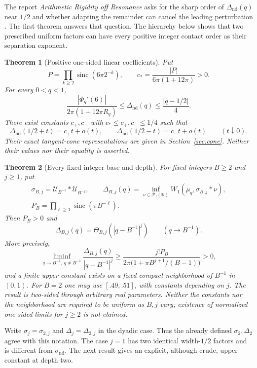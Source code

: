 \documentclass[11pt,letterpaper]{article}
\newtheorem{theorem}{Theorem}[section]
\theoremstyle{remark}\newtheorem{remark}[theorem]{Remark}
\newcommand{\R}{\mathbb R}\newcommand{\E}{\mathbb E}
\newcommand{\Un}{\mathcal U}\newcommand{\Law}{\mathcal L}
\newcommand{\Pone}{\mathcal P_1(\R)}
\newcommand{\sinc}{\operatorname{sinc}}
\begin{document}
The report \emph{Arithmetic Rigidity off Resonance} asks for the sharp order of $\Delta_{\mathrm{nd}}(q)$ near $1/2$ and whether adapting the remainder can cancel the leading perturbation \cite[question headed \emph{Sharp distance to a resonance}]{ProveIt}. The first theorem answers that question. The hierarchy below shows that two prescribed uniform factors can have every positive integer contact order as their separation exponent.

\begin{theorem}[Positive one-sided linear coefficients]\label{thm:linear}
Put
\[
P=\prod_{k\ge2}\sinc(6\pi2^{-k}),\qquad
c_* =\frac{|P|}{6\pi(1+12\pi)}>0.
\]
For every $0<q<1$,
\begin{equation}\label{eq:linear-bounds}
\frac{|\Phi_q'(6)|}{2\pi(1+12\pi R_q)}
\le\Delta_{\mathrm{nd}}(q)\le\frac{|q-1/2|}{4}.
\end{equation}
There exist constants $c_+,c_-$ with $c_*\le c_+,c_-\le1/4$ such that
\[
\Delta_{\mathrm{nd}}(1/2+t)=c_+t+o(t),\qquad
\Delta_{\mathrm{nd}}(1/2-t)=c_-t+o(t)\qquad(t\downarrow0).
\]
Their exact tangent-cone representations are given in Section~\ref{sec:cone}. Neither their values nor their equality is asserted.
\end{theorem}

\begin{theorem}[Every fixed integer base and depth]\label{thm:hierarchy}
For fixed integers $B\ge2$ and $j\ge1$, put
\begin{gather*}
\sigma_{B,j}=\Un_{B^{-1}}*\Un_{B^{-j}},\qquad
\Delta_{B,j}(q)=\inf_{\nu\in\Pone}W_1(\mu_q,\sigma_{B,j}*\nu),\\
P_B=\prod_{\ell\ge1}\sinc(\pi B^{-\ell}).
\end{gather*}
Then $P_B>0$ and
\[
\Delta_{B,j}(q)=\Theta_{B,j}(|q-B^{-1}|^j)\qquad(q\to B^{-1}).
\]
More precisely,
\[
\liminf_{q\to B^{-1},\ q\ne B^{-1}}
\frac{\Delta_{B,j}(q)}{|q-B^{-1}|^j}
\ge\frac{j!P_B}{2\pi\bigl(1+\pi B^{j+1}/(B-1)\bigr)}>0,
\]
and a finite upper constant exists on a fixed compact neighborhood of $B^{-1}$ in $(0,1)$. For $B=2$ one may use $[.49,.51]$, with constants depending on $j$. The result is two-sided through arbitrary real parameters. Neither the constants nor the neighborhood are required to be uniform as $B,j$ vary; existence of normalized one-sided limits for $j\ge2$ is not claimed.
\end{theorem}

Write $\sigma_j=\sigma_{2,j}$ and $\Delta_j=\Delta_{2,j}$ in the dyadic case. Thus the already defined $\sigma_2,\Delta_2$ agree with this notation. The case $j=1$ has two identical width-$1/2$ factors and is different from $\sigma_{\mathrm{nd}}$. The next result gives an explicit, although crude, upper constant at depth two.
\end{document}
